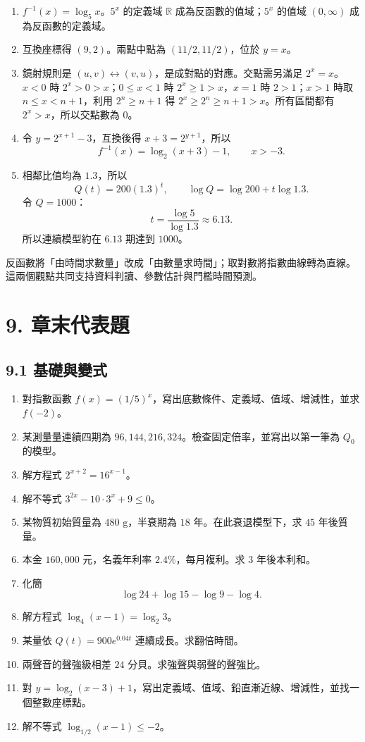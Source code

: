 \documentclass[11pt,a4paper]{article}
\providecommand{\tightlist}{%
  \setlength{\itemsep}{0pt}\setlength{\parskip}{0pt}}
\begin{document}
\begin{enumerate}
\def\labelenumi{\arabic{enumi}.}
\tightlist
\item
  \(f^{-1}(x)=\log_5x\)。\(5^x\) 的定義域 \(\mathbb R\) 成為反函數的值域；\(5^x\) 的值域 \((0,\infty)\) 成為反函數的定義域。
\item
  互換座標得 \((9,2)\)。兩點中點為 \((11/2,11/2)\)，位於 \(y=x\)。
\item
  鏡射規則是 \((u,v)\leftrightarrow(v,u)\)，是成對點的對應。交點需另滿足 \(2^x=x\)。\(x<0\) 時 \(2^x>0>x\)；\(0\le x<1\) 時 \(2^x\ge1>x\)，\(x=1\) 時 \(2>1\)；\(x>1\) 時取 \(n\le x<n+1\)，利用 \(2^n\ge n+1\) 得 \(2^x\ge2^n\ge n+1>x\)。所有區間都有 \(2^x>x\)，所以交點數為 \(0\)。
\item
  令 \(y=2^{x+1}-3\)，互換後得 \(x+3=2^{y+1}\)，所以
  \[
  f^{-1}(x)=\log_2(x+3)-1,\qquad x>-3.
  \]
\item
  相鄰比值均為 \(1.3\)，所以
  \[
  Q(t)=200(1.3)^t,\qquad
  \log Q=\log200+t\log1.3.
  \]
  令 \(Q=1000\)：
  \[
  t=\frac{\log5}{\log1.3}\approx6.13.
  \]
  所以連續模型約在 \(6.13\) 期達到 \(1000\)。
\end{enumerate}

反函數將「由時間求數量」改成「由數量求時間」；取對數將指數曲線轉為直線。這兩個觀點共同支持資料判讀、參數估計與門檻時間預測。

\section{9. 章末代表題}\label{ux7ae0ux672bux4ee3ux8868ux984c}

\subsection{9.1 基礎與變式}\label{ux57faux790eux8207ux8b8aux5f0f}

\begin{enumerate}
\def\labelenumi{\arabic{enumi}.}
\tightlist
\item
  對指數函數 \(f(x)=(1/5)^x\)，寫出底數條件、定義域、值域、增減性，並求 \(f(-2)\)。
\item
  某測量量連續四期為 \(96,144,216,324\)。檢查固定倍率，並寫出以第一筆為 \(Q_0\) 的模型。
\item
  解方程式 \(2^{x+2}=16^{x-1}\)。
\item
  解不等式 \(3^{2x}-10\cdot3^x+9\le0\)。
\item
  某物質初始質量為 \(480\text{ g}\)，半衰期為 \(18\) 年。在此衰退模型下，求 \(45\) 年後質量。
\item
  本金 \(160{,}000\) 元，名義年利率 \(2.4\%\)，每月複利。求 \(3\) 年後本利和。
\item
  化簡
  \[
  \log24+\log15-\log9-\log4.
  \]
\item
  解方程式 \(\log_4(x-1)=\log_2 3\)。
\item
  某量依 \(Q(t)=900e^{0.04t}\) 連續成長。求翻倍時間。
\item
  兩聲音的聲強級相差 \(24\) 分貝。求強聲與弱聲的聲強比。
\item
  對 \(y=\log_2(x-3)+1\)，寫出定義域、值域、鉛直漸近線、增減性，並找一個整數座標點。
\item
  解不等式 \(\log_{1/2}(x-1)\le-2\)。
\end{enumerate}
\end{document}
